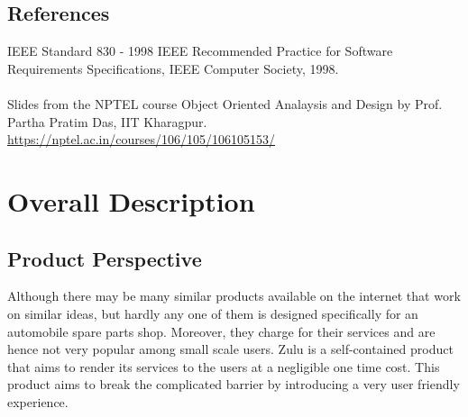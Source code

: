 \documentclass{scrreprt}
\begin{document}
\section{References}

IEEE Standard 830 - 1998 IEEE Recommended Practice for Software Requirements Specifications, IEEE Computer Society, 1998.\\ \\
Slides from the NPTEL course Object Oriented Analaysis and Design by Prof. Partha Pratim Das, IIT Kharagpur.\\
\url{https://nptel.ac.in/courses/106/105/106105153/}

\chapter{Overall Description}

\section{Product Perspective}

Although there may be many similar products available on the internet that work on similar ideas, but hardly any one of them is designed specifically for an automobile spare parts shop. Moreover, they charge for their services and are hence not very popular among small scale users. Zulu is a self-contained product that aims to render its services to the users at a negligible one time cost. This product aims to break the complicated barrier by introducing a very user friendly experience.
\end{document}
